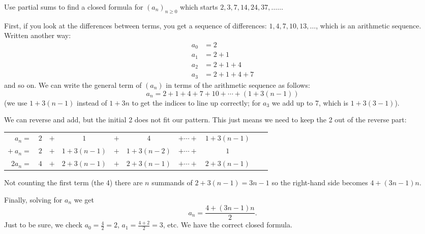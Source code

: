 \documentclass[11pt,]{book}
\theoremstyle{ptxplainnotitle}
\theoremstyle{ptxplaintitle}
\theoremstyle{ptxdefinitionnotitle}
\theoremstyle{ptxdefinitiontitle}
\theoremstyle{ptxdefinitionnotitle}
\theoremstyle{ptxdefinitiontitle}
\theoremstyle{ptxdefinitionnotitle}
\theoremstyle{ptxdefinitiontitle}
\theoremstyle{ptxdefinitiontitlenonumber}
\theoremstyle{ptxdefinitiontitlenonumber}
\numberwithin{equation}{chapter}
\newcommand{\hrulethin}  {\noalign{\hrule height 0.04em}}
\renewcommand{\d}{\displaystyle}
\newcommand{\amp}{&}
\begin{document}
\begin{example}\label{example-sum-of-arithmetic}
\hypertarget{p-199}{}%
Use partial sums to find a closed formula for \((a_n)_{n\ge 0}\) which starts \(2, 3, 7, 14, 24, 37,\ldots \ldots\)%
\par\smallskip%
\noindent\textbf{}\hypertarget{solution-20}{}\hypertarget{p-200}{}%
First, if you look at the differences between terms, you get a sequence of differences: \(1,4,7,10,13, \ldots\), which is an arithmetic sequence.  Written another way:%
\begin{align*}
a_0 \amp = 2\\
a_1 \amp = 2+1\\
a_2 \amp = 2+1+4\\
a_3 \amp = 2+1+4+7
\end{align*}
and so on. We can write the general term of \((a_n)\) in terms of the arithmetic sequence as follows:%
\begin{equation*}
a_n = 2 + 1 + 4 + 7 + 10 + \cdots + (1+3(n-1))
\end{equation*}
(we use \(1+3(n-1)\) instead of \(1+3n\) to get the indices to line up correctly; for \(a_3\) we add up to 7, which is \(1+3(3-1)\)).%
\par
\hypertarget{p-201}{}%
We can reverse and add, but the initial 2 does not fit our pattern.  This just means we need to keep the 2 out of the reverse part:%
\begin{sidebyside}{1}{0}{0}{0}
\begin{sbspanel}{1}
{\centering%
\begin{tabular}{rccccccccc}
\(a_n  =\)&\(2\)&\(+\)&\(1\)&\(+\)&\(4\)&\(+ \cdots +\)&\(1+3(n-1)\)\tabularnewline[0pt]
\(+ ~ a_n  =\)&\(2\)&\(+\)&\(1+3(n-1)\)&\(+\)&\(1+3(n-2)\)&\(+ \cdots +\)&\(1\)\tabularnewline\hrulethin
\(2a_n =\)&\(4\)&\(+\)&\(2+3(n-1)\)&\(+\)&\(2+3(n-1)\)&\(+ \cdots +\)&\(2+3(n-1)\)
\end{tabular}
\par}
\end{sbspanel}
\end{sidebyside}
\par
\hypertarget{p-202}{}%
Not counting the first term (the 4) there are \(n\) summands of \(2+3(n-1) = 3n-1\) so the right-hand side becomes \(4+(3n-1)n\).%
\par
\hypertarget{p-203}{}%
Finally, solving for \(a_n\) we get%
\begin{equation*}
a_n = \d \frac{4+(3n-1)n}{2}.
\end{equation*}
Just to be sure, we check \(a_0 = \frac{4}{2} = 2\), \(a_1 = \frac{4+2}{2} = 3\), etc.  We have the correct closed formula.%
\end{example}
\typeout{************************************************}
\typeout{************************************************}
\end{document}
